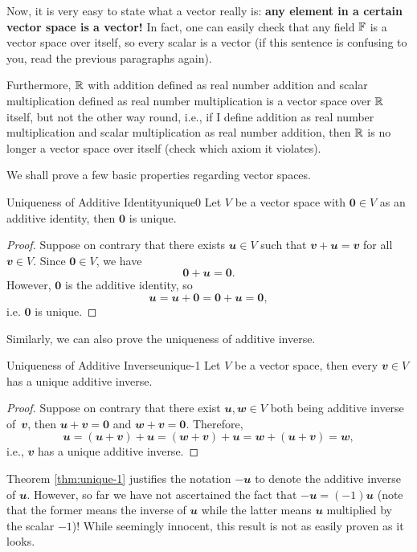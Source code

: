\documentclass[math]{amznotes}
\theoremstyle{remark}
\newcommand{\zero}{\mathbf{0}}
\begin{document}
Now, it is very easy to state what a vector really is: \textbf{any element in a certain vector space is a vector!} In fact, one can easily check that any field $\mathbb{F}$ is a vector space over itself, so every scalar is a vector (if this sentence is confusing to you, read the previous paragraphs again).

Furthermore, $\mathbb{R}$ with addition defined as real number addition and scalar multiplication defined as real number multiplication is a vector space over $\mathbb{R}$ itself, but not the other way round, i.e., if I define addition as real number multiplication and scalar multiplication as real number addition, then $\mathbb{R}$ is no longer a vector space over itself (check which axiom it violates).

We shall prove a few basic properties regarding vector spaces.
\begin{thmbox}{Uniqueness of Additive Identity}{unique0}
    Let $V$ be a vector space with $\zero \in V$ as an additive identity, then $\zero$ is unique.
    \tcblower
    \begin{proof}
        Suppose on contrary that there exists $\mathbfit{u} \in V$ such that $\mathbfit{v + u = v}$ for all $\mathbfit{v} \in V$. Since $\zero \in V$, we have
        \begin{equation*}
            \zero + \mathbfit{u} = \zero.
        \end{equation*}
        However, $\zero$ is the additive identity, so 
        \begin{equation*}
            \mathbfit{u} = \mathbfit{u} + \zero = \zero + \mathbfit{u} = \zero,
        \end{equation*}
        i.e. $\zero$ is unique.
    \end{proof}
\end{thmbox}
Similarly, we can also prove the uniqueness of additive inverse.
\begin{thmbox}{Uniqueness of Additive Inverse}{unique-1}
    Let $V$ be a vector space, then every $\mathbfit{v} \in V$ has a unique additive inverse.
    \tcblower
    \begin{proof}
        Suppose on contrary that there exist $\mathbfit{u, w} \in V$ both being additive inverse of~$\mathbfit{v}$, then $\mathbfit{u + v} = \zero$ and $\mathbfit{w + v} = \zero$. Therefore,
        \begin{equation*}
            \mathbfit{u} = \mathbfit{(u + v) + u} = \mathbfit{(w + v) + u} = \mathbfit{w + (u + v)} = \mathbfit{w},
        \end{equation*}
        i.e., $\mathbfit{v}$ has a unique additive inverse.
    \end{proof}
\end{thmbox}
Theorem \ref{thm:unique-1} justifies the notation $-\mathbfit{u}$ to denote the additive inverse of $\mathbfit{u}$. However, so far we have not ascertained the fact that $-\mathbfit{u} = (-1)\mathbfit{u}$ (note that the former means the inverse of $\mathbfit{u}$ while the latter means $\mathbfit{u}$ multiplied by the scalar $-1$)! While seemingly innocent, this result is not as easily proven as it looks.
\end{document}

